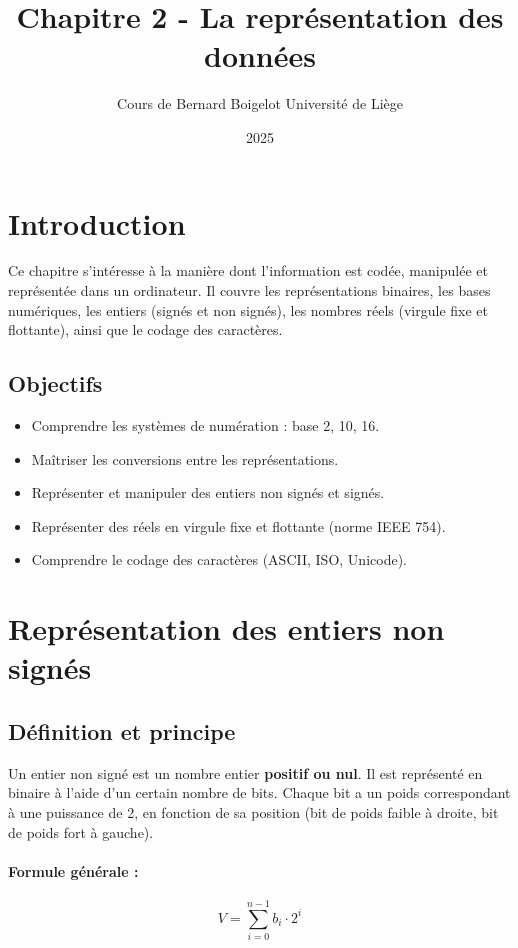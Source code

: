 \documentclass[12pt,a4paper]{article}
\title{\Huge\textbf{Chapitre 2 - La représentation des données}}
\author{Cours de Bernard Boigelot \newline Université de Liège}
\date{2025}
\begin{document}
\maketitle

\tableofcontents

\newpage

\section{Introduction}
Ce chapitre s'intéresse à la manière dont l'information est codée, manipulée et représentée dans un ordinateur. Il couvre les représentations binaires, les bases numériques, les entiers (signés et non signés), les nombres réels (virgule fixe et flottante), ainsi que le codage des caractères.

\subsection*{Objectifs}
\begin{itemize}
    \item Comprendre les systèmes de numération : base 2, 10, 16.
    \item Maîtriser les conversions entre les représentations.
    \item Représenter et manipuler des entiers non signés et signés.
    \item Représenter des réels en virgule fixe et flottante (norme IEEE 754).
    \item Comprendre le codage des caractères (ASCII, ISO, Unicode).
\end{itemize}

\newpage

\section{Représentation des entiers non signés}

\subsection{Définition et principe}
Un entier non signé est un nombre entier \textbf{positif ou nul}. Il est représenté en binaire à l’aide d’un certain nombre de bits. Chaque bit a un poids correspondant à une puissance de 2, en fonction de sa position (bit de poids faible à droite, bit de poids fort à gauche).

\paragraph{Formule générale :}
\[ V = \sum_{i=0}^{n-1} b_i \cdot 2^i \]
\end{document}
